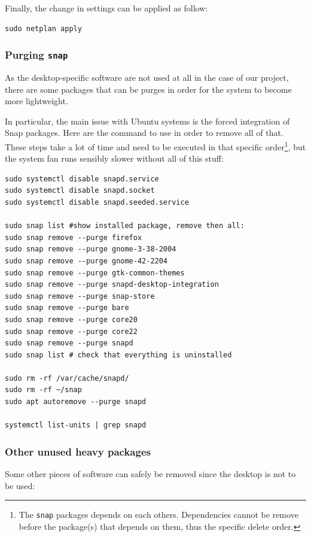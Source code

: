 \documentclass[10pt]{article}
\begin{document}
Finally, the change in settings can be applied
as follow:

\begin{verbatim}
sudo netplan apply
\end{verbatim}

\subsubsection{Purging \texttt{snap}}
\label{sec:orgda26851}
As the desktop-specific software are not used at all in the case
of our project, there are some packages that can be purges in order for the
system to become more lightweight.

In particular, the main issue with Ubuntu systems is the forced integration of
Snap packages. Here are the command to use in order to remove all of that.
These steps take a lot of time and need to be executed in that specific order\footnote{The \texttt{snap} packages depends on each others. Dependencies
cannot be remove before the package(s) that depends on them,
thus the specific delete order.},
but the system fan runs sensibly slower without all of this stuff:

\begin{verbatim}
sudo systemctl disable snapd.service
sudo systemctl disable snapd.socket
sudo systemctl disable snapd.seeded.service

sudo snap list #show installed package, remove then all:
sudo snap remove --purge firefox
sudo snap remove --purge gnome-3-38-2004
sudo snap remove --purge gnome-42-2204
sudo snap remove --purge gtk-common-themes
sudo snap remove --purge snapd-desktop-integration
sudo snap remove --purge snap-store
sudo snap remove --purge bare
sudo snap remove --purge core20
sudo snap remove --purge core22
sudo snap remove --purge snapd
sudo snap list # check that everything is uninstalled

sudo rm -rf /var/cache/snapd/
sudo rm -rf ~/snap
sudo apt autoremove --purge snapd

systemctl list-units | grep snapd
\end{verbatim}

\subsubsection{Other unused heavy packages}
\label{sec:org88303f3}
Some other pieces of software can safely be removed since the desktop is
not to be used:
\end{document}
